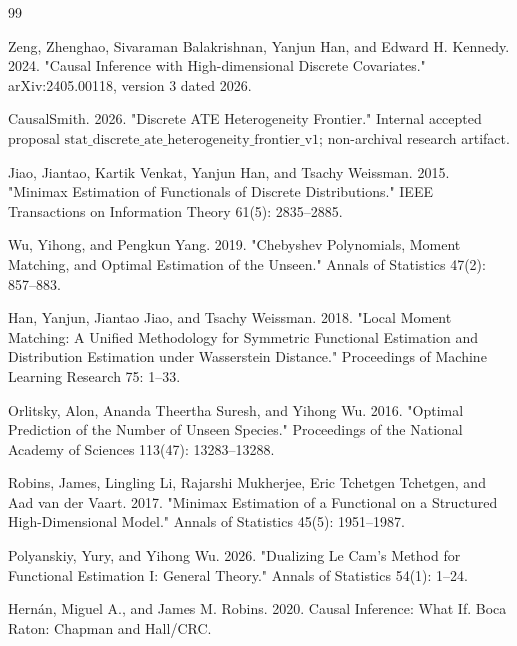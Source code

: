 \documentclass{article}
\begin{document}
\begin{thebibliography}{99}

   Zeng, Zhenghao, Sivaraman Balakrishnan, Yanjun Han, and Edward H. Kennedy. 2024. "Causal Inference with High-dimensional Discrete Covariates." arXiv:2405.00118, version 3 dated 2026.

   CausalSmith. 2026. "Discrete ATE Heterogeneity Frontier." Internal accepted proposal \(\mathrm{stat\_discrete\_ate\_heterogeneity\_frontier\_v1}\); non-archival research artifact.

   Jiao, Jiantao, Kartik Venkat, Yanjun Han, and Tsachy Weissman. 2015. "Minimax Estimation of Functionals of Discrete Distributions." IEEE Transactions on Information Theory 61(5): 2835--2885.

   Wu, Yihong, and Pengkun Yang. 2019. "Chebyshev Polynomials, Moment Matching, and Optimal Estimation of the Unseen." Annals of Statistics 47(2): 857--883.

   Han, Yanjun, Jiantao Jiao, and Tsachy Weissman. 2018. "Local Moment Matching: A Unified Methodology for Symmetric Functional Estimation and Distribution Estimation under Wasserstein Distance." Proceedings of Machine Learning Research 75: 1--33.

   Orlitsky, Alon, Ananda Theertha Suresh, and Yihong Wu. 2016. "Optimal Prediction of the Number of Unseen Species." Proceedings of the National Academy of Sciences 113(47): 13283--13288.

   Robins, James, Lingling Li, Rajarshi Mukherjee, Eric Tchetgen Tchetgen, and Aad van der Vaart. 2017. "Minimax Estimation of a Functional on a Structured High-Dimensional Model." Annals of Statistics 45(5): 1951--1987.

   Polyanskiy, Yury, and Yihong Wu. 2026. "Dualizing Le Cam's Method for Functional Estimation I: General Theory." Annals of Statistics 54(1): 1--24.

   Hernán, Miguel A., and James M. Robins. 2020. Causal Inference: What If. Boca Raton: Chapman and Hall/CRC.

\end{thebibliography}
\end{document}
